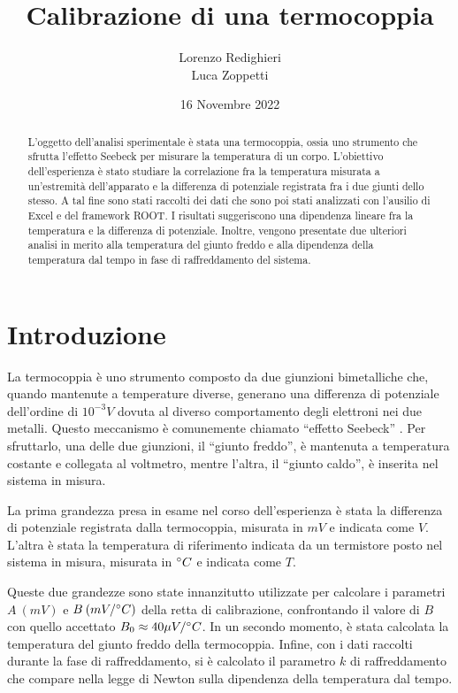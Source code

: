 \documentclass{article}
\title{Calibrazione di una termocoppia}
\author{Lorenzo Redighieri\\Luca Zoppetti}
\date{16 Novembre 2022}
\begin{document}
\maketitle

\begin{abstract}
L'oggetto dell'analisi sperimentale è stata una termocoppia, ossia uno strumento che sfrutta l'effetto Seebeck per misurare la temperatura di un corpo. L’obiettivo dell’esperienza è stato studiare la correlazione fra la temperatura misurata a un'estremità dell'apparato e la differenza di potenziale registrata fra i due giunti dello stesso. A tal fine sono stati raccolti dei dati che sono poi stati analizzati con l’ausilio di Excel e del framework ROOT. I risultati suggeriscono una dipendenza lineare fra la temperatura e la differenza di potenziale. Inoltre, vengono presentate due ulteriori analisi in merito alla temperatura del giunto freddo e alla dipendenza della temperatura dal tempo in fase di raffreddamento del sistema.
\end{abstract}

\newpage

\section{Introduzione}
La termocoppia è uno strumento composto da due giunzioni bimetalliche che, quando mantenute a temperature diverse, generano una differenza di potenziale dell’ordine di $10^{-3}V$ dovuta al diverso comportamento degli elettroni nei due metalli. Questo meccanismo è comunemente chiamato “effetto Seebeck” \cite{seebeck}. Per sfruttarlo, una delle due giunzioni, il “giunto freddo”, è mantenuta a temperatura costante e collegata al voltmetro, mentre l’altra, il “giunto caldo”, è inserita nel sistema in misura.

La prima grandezza presa in esame nel corso dell’esperienza è stata la differenza di potenziale registrata dalla termocoppia, misurata in $mV$ e indicata come $V$. L’altra è stata la temperatura di riferimento indicata da un termistore posto nel sistema in misura, misurata in $\degree C$ e indicata come $T$.

Queste due grandezze sono state innanzitutto utilizzate per calcolare i parametri $A \medspace (mV)$ e $B \medspace (mV/\degree C)$ della retta di calibrazione, confrontando il valore di $B$ con quello accettato $B_0 \approx 40 \mu V/\degree C$. In un secondo momento, è stata calcolata la temperatura del giunto freddo della termocoppia. Infine, con i dati raccolti durante la fase di raffreddamento, si è calcolato il parametro $k$ di raffreddamento che compare nella legge di Newton sulla dipendenza della temperatura dal tempo.
\end{document}
